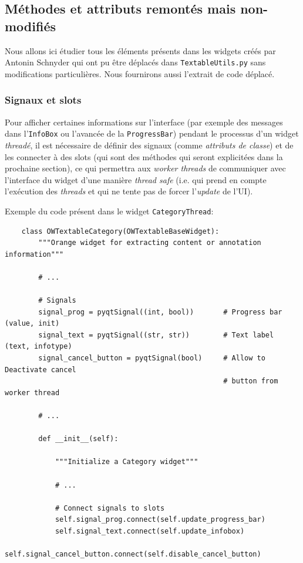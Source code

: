 \documentclass{article}
\begin{document}
\subsection{Méthodes et attributs remontés mais non-modifiés}

Nous allons ici étudier tous les éléments présents dans les widgets créés par Antonin Schnyder qui ont pu être déplacés dans \texttt{TextableUtils.py} sans modifications particulières. Nous fournirons aussi l'extrait de code déplacé.

\subsubsection{Signaux et slots}

Pour afficher certaines informations sur l'interface (par exemple des messages dans l'\texttt{InfoBox} ou l'avancée de la \texttt{ProgressBar}) pendant le processus d'un widget \textit{threadé}, il est nécessaire de définir des signaux (comme \textit{attributs de classe}) et de les connecter à des slots (qui sont des méthodes qui seront explicitées dans la prochaine section), ce qui permettra aux \textit{worker threads} de communiquer avec l'interface du widget d'une manière \textit{thread safe} (i.e. qui prend en compte l'exécution des \textit{threads} et qui ne tente pas de forcer l'\textit{update} de l'UI). 
\newline

Exemple du code présent dans le widget \texttt{CategoryThread}:


\begin{verbatim}
    class OWTextableCategory(OWTextableBaseWidget):
        """Orange widget for extracting content or annotation information"""

        # ...

        # Signals
        signal_prog = pyqtSignal((int, bool))       # Progress bar (value, init)
        signal_text = pyqtSignal((str, str))        # Text label (text, infotype)
        signal_cancel_button = pyqtSignal(bool)     # Allow to Deactivate cancel
                                                    # button from worker thread

        # ...
        
        def __init__(self):

            """Initialize a Category widget"""

            # ...

            # Connect signals to slots
            self.signal_prog.connect(self.update_progress_bar) 
            self.signal_text.connect(self.update_infobox)
            self.signal_cancel_button.connect(self.disable_cancel_button)
\end{verbatim}
\end{document}
